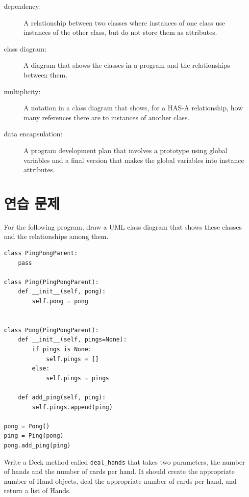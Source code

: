 \documentclass[10pt]{book}
\begin{document}
\begin{description}
\item[dependency:] A relationship between two classes
where instances of one class use instances of the other class,
but do not store them as attributes.

\item[class diagram:] A diagram that shows the classes in a program
and the relationships between them.

\item[multiplicity:] A notation in a class diagram that shows, for
a HAS-A relationship, how many references there are to instances
of another class.

\item[data encapsulation:]  A program development plan that
involves a prototype using global variables and a final version
that makes the global variables into instance attributes. 

\end{description}


\section{연습 문제}

\begin{exercise}
For the following program, draw a UML class diagram that shows
these classes and the relationships among them.

\begin{verbatim}
class PingPongParent:
    pass

class Ping(PingPongParent):
    def __init__(self, pong):
        self.pong = pong


class Pong(PingPongParent):
    def __init__(self, pings=None):
        if pings is None:
            self.pings = []
        else:
            self.pings = pings

    def add_ping(self, ping):
        self.pings.append(ping)

pong = Pong()
ping = Ping(pong)
pong.add_ping(ping)
\end{verbatim}


\end{exercise}



\begin{exercise}
Write a Deck method called \verb"deal_hands" that
takes two parameters, the number of hands and the number of cards per
hand.  It should create the appropriate number of Hand objects, deal
the appropriate number of cards per hand, and return a list of Hands.
\end{exercise}
\end{document}
